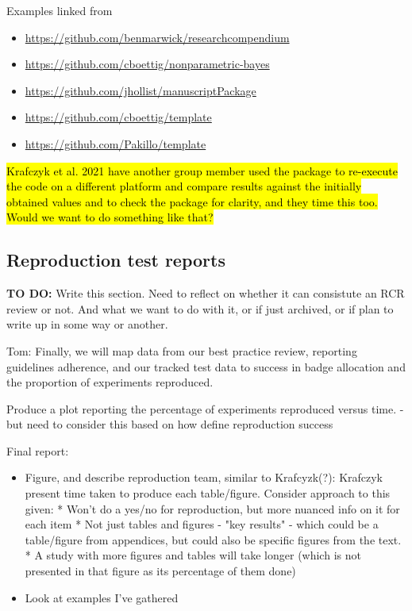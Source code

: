 Examples linked from \autocite{marwick_packaging_2018}
\begin{itemize}
    \item \url{https://github.com/benmarwick/researchcompendium}
    \item \url{https://github.com/cboettig/nonparametric-bayes}
    \item \url{https://github.com/jhollist/manuscriptPackage}
    \item \url{https://github.com/cboettig/template}
    \item \url{https://github.com/Pakillo/template}
\end{itemize}

\hl{Krafczyk et al. 2021 have another group member used the package to re-execute the code on a different platform and compare results against the initially obtained values and to check the package for clarity, and they time this too. Would we want to do something like that?}

\subsection{Reproduction test reports}
\logno


\textbf{TO DO:} Write this section. Need to reflect on whether it can consistute an RCR review or not. And what we want to do with it, or if just archived, or if plan to write up in some way or another.

Tom: Finally, we will map data from our best practice review, reporting guidelines adherence, and our tracked test data to success in badge allocation and the proportion of experiments reproduced.

Produce a plot reporting the percentage of experiments reproduced versus time. - but need to consider this based on how define reproduction success

Final report:
\begin{itemize}
    \item Figure, and describe reproduction team, similar to Krafcyzk(?):\autocite{krafczyk_learning_2021} Krafczyk present time taken to produce each table/figure. Consider approach to this given: * Won't do a yes/no for reproduction, but more nuanced info on it for each item * Not just tables and figures - "key results" - which could be a table/figure from appendices, but could also be specific figures from the text. * A study with more figures and tables will take longer (which is not presented in that figure as its percentage of them done)
    \item Look at examples I've gathered
\end{itemize}

